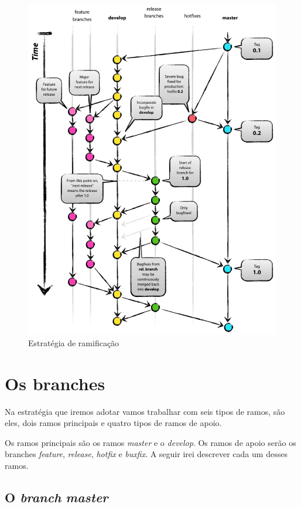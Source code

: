 \documentclass[12pt,openright,oneside,a4paper,english,brazil]{abntex2}
\begin{document}
 \begin{figure}[h]
 	\caption{\label{estrategia}Estratégia de ramificação}
 	\begin{center}
 		\includegraphics[width=0.85\linewidth]{imagens/estrategia}
 	\end{center}
 \end{figure}


\section{Os branches}

Na estratégia que iremos adotar vamos trabalhar com seis tipos de ramos, são eles, dois ramos principais e quatro tipos de ramos de apoio. 

Os ramos principais são os ramos \textit{master} e o \textit{develop}. Os ramos de apoio serão os branches \textit{feature}, \textit{release}, \textit{hotfix} e \textit{buxfix}. A seguir irei descrever cada um desses ramos. 

\subsection{O \textit{branch} \textit{master}}
\end{document}
